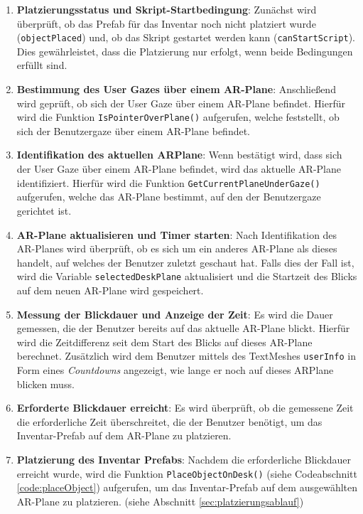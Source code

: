 \begin{enumerate}
    \item \textbf{Platzierungsstatus und Skript-Startbedingung}: Zunächst wird überprüft, ob das Prefab für das Inventar
    noch nicht platziert wurde (\texttt{objectPlaced}) und, ob das Skript gestartet werden kann (\texttt{canStartScript}).
    Dies gewährleistet, dass die Platzierung nur erfolgt, wenn beide Bedingungen erfüllt sind.

    \item \textbf{Bestimmung des User Gazes über einem AR-Plane}: Anschließend wird geprüft, ob sich der User Gaze über einem
    AR-Plane befindet. Hierfür wird die Funktion \texttt{IsPointerOverPlane()} aufgerufen, welche feststellt, ob sich der
    Benutzergaze über einem AR-Plane befindet.

    \item \textbf{Identifikation des aktuellen ARPlane}: Wenn bestätigt wird, dass sich der User Gaze über einem AR-Plane
    befindet, wird das aktuelle AR-Plane identifiziert. Hierfür wird die Funktion \texttt{GetCurrentPlaneUnderGaze()} aufgerufen,
    welche das AR-Plane bestimmt, auf den der Benutzergaze gerichtet ist.

    \item \textbf{AR-Plane aktualisieren und Timer starten}: Nach Identifikation des AR-Planes wird überprüft, ob es sich um
    ein anderes AR-Plane als dieses handelt, auf welches der Benutzer zuletzt geschaut hat. Falls dies der Fall ist, wird
    die Variable \texttt{selectedDeskPlane} aktualisiert und die Startzeit des Blicks auf dem neuen AR-Plane wird gespeichert.

    \item \textbf{Messung der Blickdauer und Anzeige der Zeit}: Es wird die Dauer gemessen, die der Benutzer bereits auf das
    aktuelle AR-Plane blickt. Hierfür wird die Zeitdifferenz seit dem Start des Blicks auf dieses AR-Plane berechnet.
    Zusätzlich wird dem Benutzer mittels des TextMeshes \texttt{userInfo} in Form eines \textit{Countdowns} angezeigt, wie
    lange er noch auf dieses ARPlane blicken muss.

    \item \textbf{Erforderte Blickdauer erreicht}: Es wird überprüft, ob die gemessene Zeit die erforderliche Zeit
    überschreitet, die der Benutzer benötigt, um das Inventar-Prefab auf dem AR-Plane zu platzieren.

    \item \textbf{Platzierung des Inventar Prefabs}: Nachdem die erforderliche Blickdauer erreicht wurde, wird die Funktion
    \texttt{PlaceObjectOnDesk()} (siehe Codeabschnitt \ref{code:placeObject}) aufgerufen, um das Inventar-Prefab auf dem
    ausgewählten AR-Plane zu platzieren. (siehe Abschnitt \ref{sec:platzierungsablauf})


\end{enumerate}
